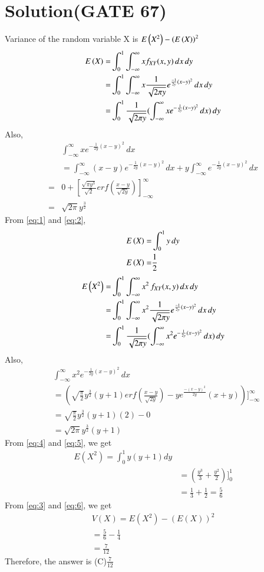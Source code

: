 \documentclass[journal,12pt,twocolumn]{IEEEtran}
\begin{document}
\section*{\textbf{Solution(GATE 67)}}
Variance of the random variable X is $E\left(X^2\right)-\left(E\left(X\right)\right)^2$\\
\begin{align}
 E\left(X\right)=&\int_{0}^{1}\int_{-\infty}^{\infty}x f_{XY}(x,y)\,dx\,dy\\
    =&\int_{0}^{1}\int_{-\infty}^{\infty}x\frac{1}{\sqrt{2\pi y}}e^{\frac{-1}{2y}(x-y)^2}\,dx \,dy\\
     =&\int_{0}^{1}\frac{1}{\sqrt{2\pi y}}(\int_{-\infty}^{\infty}xe^{-\frac{1}{2y}(x-y)^2}\,dx)\,dy \label{eq:1}
\end{align}
Also, 
\begin{align}
    &\int_{-\infty}^{\infty}xe^{-\frac{1}{2y}(x-y)^2}\,dx\\
  &=\int_{-\infty}^{\infty}(x-y)e^{-\frac{1}{2y}(x-y)^2}\,dx+y\int_{-\infty}^{\infty}e^{-\frac{1}{2y}(x-y)^2}\,dx\\
  =&0+[\frac{\sqrt{\pi y^3}}{\sqrt{2}}erf(\frac{x-y}{\sqrt{2y}})]_{-\infty}^{\infty}\\
  =&\sqrt{2\pi}y^\frac{3}{2} \label{eq:2}
\end{align}
From \eqref{eq:1} and \eqref{eq:2}, 
\begin{align}
E\left(X\right)=&\int_{0}^{1}y\,dy\\
E\left(X\right)=&\frac{1}{2} \label{eq:3}
\end{align}
\begin{align}
 E\left(X^2\right)=&\int_{0}^{1}\int_{-\infty}^{\infty}x^2\,f_{XY}(x, y)\,dx\,dy\\   
 =&\int_{0}^{1}\int_{-\infty}^{\infty}x^2\frac{1}{\sqrt{2\pi y}}e^{\frac{-1}{2y}(x-y)^2}\,dx \,dy\\
 =&\int_{0}^{1}\frac{1}{\sqrt{2\pi y}}(\int_{-\infty}^{\infty}x^2e^{-\frac{1}{2y}(x-y)^2}\,dx)\,dy
 \label{eq:4}
\end{align}
Also, 
\begin{align}
&\int_{-\infty}^{\infty}x^2e^{-\frac{1}{2y}(x-y)^2}\,dx\\
&=(\sqrt{\frac{\pi}{2}}y^\frac{3}{2}(y+1)erf(\frac{x-y}{\sqrt{2y}}) - ye^\frac{-(x-y)^2}{2y}(x+y))]_{-\infty}^{\infty}\\
&=\sqrt{\frac{\pi}{2}}y^\frac{3}{2}(y+1)(2) - 0\\
&=\sqrt{2\pi}y^\frac{3}{2}(y+1) \label{eq:5}
\end{align}
From \eqref{eq:4} and \eqref{eq:5}, we get
\begin{align}
E(X^2) = \int_{0}^{1}y(y+1)dy\\
&=(\frac{y^3}{3}+\frac{y^2}{2})]_{0}^{1}\\
&=\frac{1}{3}+\frac{1}{2}=\frac{5}{6} \label{eq:6}
\end{align}
From \eqref{eq:3} and \eqref{eq:6}, we get
\begin{align}
V(X) = E(X^2) - (E(X))^2\\
     = \frac{5}{6} - \frac{1}{4}\\
     = \frac{7}{12}
\end{align}
Therefore, the answer is (C)$\frac{7}{12}$
\end{document}

